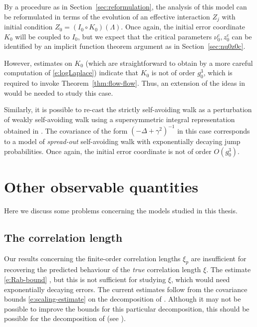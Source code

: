 By a procedure as in Section~\ref{sec:reformulation}, the analysis of this model
can be reformulated in terms of the evolution of an effective interaction $Z_j$
with initial condition $Z_0 = (I_0 \circ K_0)(\Lambda)$. Once again, the initial
error coordinate $K_0$ will be coupled to $I_0$, but we expect that the critical
parameters $\nu_0^c, z_0^c$ can be identified by an implicit function theorem
argument as in Section~\ref{sec:nu0z0c}.

However, estimates on $K_0$ (which are straightforward
to obtain by a more careful computation of \eqref{e:logLaplace}) indicate that
$K_0$ is not of order $g_0^3$, which is required to invoke Theorem~\ref{thm:flow-flow}.
Thus, an extension of the ideas in \cite{BBS-rg-flow} would be needed to study this
case.

\begin{rk}
Similarly, it is possible to re-cast the strictly self-avoiding walk as a
perturbation of weakly self-avoiding walk using a supersymmetric integral
representation obtained in \cite{BIS09}. The covariance of the form
$(-\Delta + \gamma^2)^{-1}$ in this case corresponds to a model of \emph{spread-out}
self-avoiding walk with exponentially decaying jump probabilities. Once again,
the initial error coordinate is not of order $O(g_0^3)$.
\end{rk}


\section{Other observable quantities}

Here we discuss some  problems concerning the models studied in this thesis.


\subsection{The correlation length}

Our results concerning the finite-order correlation lengths $\xi_p$ are insufficient
for recovering the predicted behaviour of the \emph{true} correlation length $\xi$.
The estimate \eqref{e:Rab-bound}
, but this is not
sufficient for studying $\xi$, which would need exponentially decaying errors.
The current estimates follow from the covariance bounds \eqref{e:scaling-estimate}
on the decomposition of \cite{Baue13a}. Although it may not be possible to improve
the bounds for this particular decomposition, this should be possible for the
decomposition of \cite{BGM04} (see \cite[p.~445]{BGM04}).

